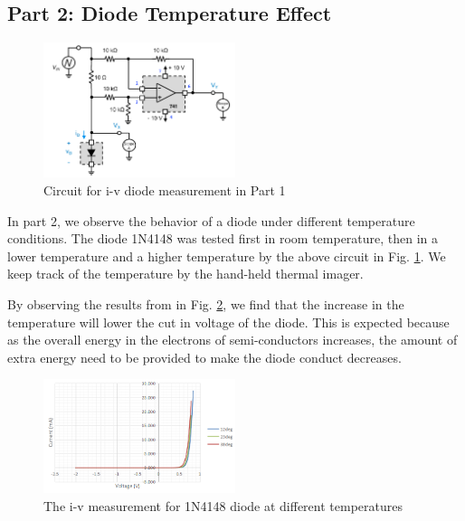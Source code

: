 \documentclass[letterpaper, 10 pt, conference]{ieeeconf}  %
\begin{document}
\subsection{Part 2: Diode Temperature Effect}
\begin{figure}[ht]
  \centering
  \includegraphics[width=0.5\textwidth]{images/Part1circuit.png}
  \caption{Circuit for i-v diode measurement in Part 1}
  \label{fig:8}
\end{figure}
In part 2, we observe the behavior of a diode under different temperature conditions. The diode 1N4148 was tested first in room temperature, then in a lower temperature and a higher temperature by the above circuit in Fig. \ref{fig:8}. We keep track of the temperature by the hand-held thermal imager.
\par By observing the results from in Fig. \ref{fig:9}, we find that the increase in the temperature will lower the cut in voltage of the diode. This is expected because as the overall energy in the electrons of semi-conductors increases, the amount of extra energy need to be provided to make the diode conduct decreases.\newline
\begin{figure}[ht]
  \centering
  \includegraphics[width=0.5\textwidth]{images/result7.png}
  \caption{The i-v measurement for 1N4148 diode at different temperatures}
  \label{fig:9}
\end{figure}
\newpage
\end{document}
